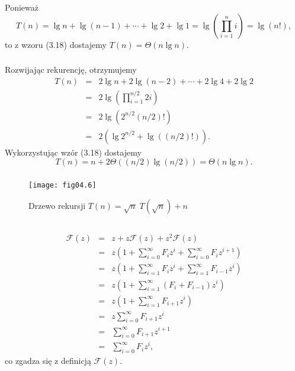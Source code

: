 \subsubsection{} %
Ponieważ
\[
	T(n) = \lg n+\lg (n-1)+\cdots +\lg 2+\lg 1 = \lg\left(\prod_{i=1}^ni\right) = \lg(n!),
\]
to z wzoru (3.18) dostajemy $T(n)=\Theta(n\lg n)$.

\subsubsection{} %
Rozwijając rekurencję, otrzymujemy
\begin{eqnarray*}
	T(n) &=& 2\lg n+2\lg(n-2)+\cdots +2\lg 4+2\lg 2 \\
	&=& 2\lg\left(\prod_{i=1}^{n/2}2i\right) \\
	&=& 2\lg\left(2^{n/2}(n/2)!\right) \\
	&=& 2\left(\lg 2^{n/2}+\lg((n/2)!)\right).
\end{eqnarray*}
Wykorzystując wzór (3.18) dostajemy
\[
	T(n) = n+2\Theta((n/2)\lg (n/2)) = \Theta(n\lg n).
\]

\subsubsection{} %
\begin{figure}[h]
	\begin{center}
		\texttt{[image: fig04.6]}
	\caption{Drzewo rekursji $T(n)=\sqrt{n}\;T\left(\sqrt{n}\right)+n$} \label{fig:4-4j}
	\end{center}
\end{figure}

\subsection{} %

\subsubsection{} %
\begin{eqnarray*}
	\mathcal{F}(z) &=& z+z\mathcal{F}(z)+z^2\mathcal{F}(z) \\
	&=& z\left(1+\sum_{i=0}^\infty F_iz^i+\sum_{i=0}^\infty F_iz^{i+1}\right) \\
	&=& z\left(1+\sum_{i=1}^\infty F_iz^i+\sum_{i=1}^\infty F_{i-1}z^i\right) \\
	&=& z\left(1+\sum_{i=1}^\infty (F_i+F_{i-1})z^i\right) \\
	&=& z\left(1+\sum_{i=1}^\infty F_{i+1}z^i\right) \\
	&=& z\sum_{i=0}^\infty F_{i+1}z^i \\
	&=& \sum_{i=0}^\infty F_{i+1}z^{i+1} \\
	&=& \sum_{i=0}^\infty F_iz^i,
\end{eqnarray*}
co zgadza się z definicją $\mathcal{F}(z)$.

